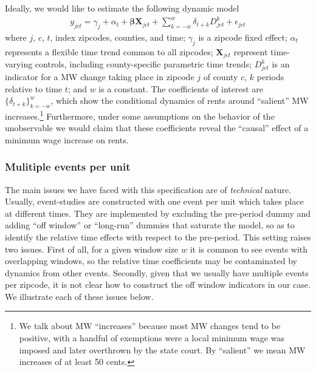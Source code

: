    Ideally, we would like to estimate the following dynamic model
    \begin{equation}\label{eq:ideal-event-study}
        \begin{split}
            y_{jct} = \gamma_{j} + \alpha_{t} + \boldsymbol{\beta} \boldsymbol{X}_{jct} + \sum_{k = -w}^{w}\delta_{t + k} D_{jct}^k + \epsilon_{jct}
        \end{split}   
    \end{equation}
    where $j$, $c$, $t$, index zipcodes, counties, and time; $\gamma_{j}$ is a zipcode fixed effect; $\alpha_{t}$ represents a flexible time trend common to all zipcodes; $\boldsymbol{X}_{jct}$ represent time-varying controls, including county-specific parametric time trends; $D_{jct}^k$ is an indicator for a MW change taking place in zipcode $j$ of county $c$, $k$ periods relative to time $t$; and $w$ is a constant. The coefficients of interest are $\{\delta_{t + k}\}_{k=-w}^w$, which show the conditional dynamics of rents around ``salient'' MW increases.\footnote{We talk about MW ``increases'' because most MW changes tend to be positive, with a handful of exemptions were a local minimum wage was imposed and later overthrown by the state court. By ``salient'' we mean MW increases of at least 50 cents.} Furthermore, under some assumptions on the behavior of the unobservable we would claim that these coefficients reveal the ``causal'' effect of a minimum wage increase on rents.

\subsubsection{Mulitiple events per unit}

    The main issues we have faced with this specification are of \textit{technical} nature. Usually, event-studies are constructed with one event per unit which takes place at different times. They are implemented by excluding the pre-period dummy and adding ``off window'' or ``long-run'' dummies that saturate the model, so as to identify the relative time effects with respect to the pre-period. This setting raises two issues. First of all, for a given window size $w$ it is common to see events with overlapping windows, so the relative time coefficients may be contaminated by dynamics from other events. Secondly, given that we usually have multiple events per zipcode, it is not clear how to construct the off window indicators in our case. We illustrate each of these issues below.
    
